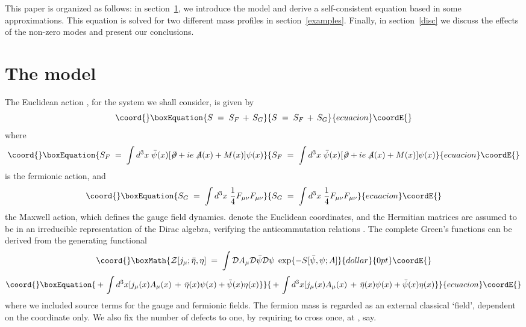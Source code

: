 \documentclass[a4paper,12pt]{article}
\begin{document}
This paper is organized as follows: in section~\ref{model}, we introduce
the model and derive a self-consistent equation based in some approximations.
This equation is solved for two different mass profiles in  
section~\ref{examples}. Finally, in section~\ref{disc} we discuss the 
effects of the non-zero modes and present our conclusions.

\section{The model}\label{model}
The Euclidean action \coordHE{}, for the system we shall consider, is given
by
\begin{equation}\coord{}\boxEquation{
   \label{dfaction}
S \;=\; S_F \,+\, S_G
}{
   S \;=\; S_F \,+\, S_G
}{ecuacion}\coordE{}\end{equation}
where
\begin{equation}\coord{}\boxEquation{
   \label{defsf}
S_F\;=\; \int d^3x \; \bar{\psi}(x) [\not \!\partial
+ i e \not \!\!A(x) + M(x) ] \psi(x)
}{
   S_F\;=\; \int d^3x \; \bar{\psi}(x) [\not \!\partial
+ i e \not \!\!A(x) + M(x) ] \psi(x)
}{ecuacion}\coordE{}\end{equation}
is the fermionic action, and
\begin{equation}\coord{}\boxEquation{
   \label{defsg}
S_G\;=\; \int d^3x \; \frac{1}{4}  F_{\mu \nu} F_{\mu \nu} 
}{
   S_G\;=\; \int d^3x \; \frac{1}{4}  F_{\mu \nu} F_{\mu \nu} 
}{ecuacion}\coordE{}\end{equation}
the Maxwell action, which defines the gauge field dynamics.
\mbox{\coordHE{}} denote the Euclidean coordinates, and the
Hermitian \myHighlight{$\gamma$}\coordHE{} matrices are assumed to be in an irreducible \coordHE{}
representation of the Dirac algebra, verifying the anticommutation
relations \coordHE{}.
The complete Green's functions can be derived from the generating
functional
$$\coord{}\boxMath{
{\mathcal Z}[j_\mu;{\bar \eta},\eta ]\;=\;\int {\mathcal D}A_\mu
{\mathcal D}{\bar \psi} {\mathcal D}\psi \; \exp \{- S[{\bar\psi},
\psi; A]
}{dollar}{0pt}\coordE{}$$
\begin{equation}\coord{}\boxEquation{
   \label{defz}
\,+\, \int d^3x [ j_\mu(x) A_\mu(x)\,+\, {\bar\eta}(x)\psi(x)
+ {\bar\psi}(x)\eta(x) \}
}{
   \,+\, \int d^3x [ j_\mu(x) A_\mu(x)\,+\, {\bar\eta}(x)\psi(x)
+ {\bar\psi}(x)\eta(x) \}
}{ecuacion}\coordE{}\end{equation}
where we included source terms for the gauge and fermionic fields.
The fermion mass is regarded as an external classical `field',
dependent on the \coordHE{} coordinate only. We also fix the number of
defects to one, by requiring \coordHE{} to cross \coordHE{} once, at \coordHE{},
say.
\end{document}
